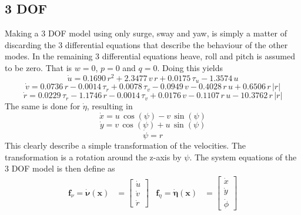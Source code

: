 \documentclass[12pt,a4]{article}
\begin{document}
\subsection{3 DOF}
Making a 3 DOF model using only surge, sway and yaw, is simply a matter of discarding the 3 differential equations that describe the behaviour of the other modes.
In the remaining 3 differential equations heave, roll and pitch is assumed to be zero. That is $w = 0$, $p=0$ and $q = 0$.
Doing this yields
\begin{equation*}
	\dot{u} = 0.1690\,r^2+2.3477\,v\,r+0.0175\,\tau _{u}-1.3574\,u
\end{equation*}
\begin{equation*}
	\dot{v} = 0.0736\,r-0.0014\,\tau _{r}+0.0078\,\tau _{v}-0.0949\,v-0.4028\,r\,u+0.6506\,r\,\left|r\right|
\end{equation*}
\begin{equation*}
	\dot{r} = 0.0229\,\tau _{r}-1.1746\,r-0.0014\,\tau _{v}+0.0176\,v-0.1107\,r\,u-10.3762\,r\,\left|r\right|
\end{equation*}
The same is done for $\dot{\eta}$, resulting in
\begin{equation*}
	\dot{x} = u\,\cos\left(\psi \right)-v\,\sin\left(\psi \right)
\end{equation*}
\begin{equation*}
	\dot{y} = v\,\cos\left(\psi \right)+u\,\sin\left(\psi \right)
\end{equation*}
\begin{equation*}
	\dot{\psi} = r
\end{equation*}
This clearly describe a simple transformation of the velocities. The transformation is a rotation around the z-axis by $\psi$.
The system equations of the 3 DOF model is then define as
\begin{align}
	\bm{f}_\nu = \bm{\dot{\nu}(x)}   & = \begin{bmatrix} \dot{u} \\ \dot{v} \\ \dot{r} \end{bmatrix} &
	\bm{f}_\eta = \bm{\dot{\eta}(x)} & = \begin{bmatrix} \dot{x} \\ \dot{y} \\ \dot{\phi} \end{bmatrix}
\end{align}
\end{document}
